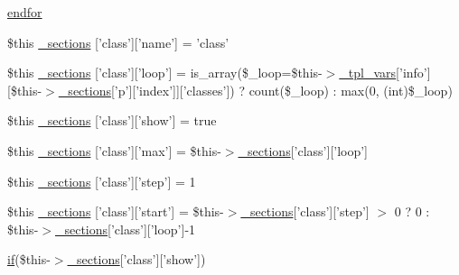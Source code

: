 \begin{DoxyCompactItemize}
\item 
\hyperlink{_06_06-72_05_06_06-727729411_05left__frame_8tpl_8php_ae8fdc27183f296411bac00ed522ee1ac}{endfor}
\item 
\$this \hyperlink{_06_06-72_05_06_06-727729411_05left__frame_8tpl_8php_a1ea4d6d540506331e10a8fa9659c92b7}{\-\_\-sections} \mbox{[}'class'\mbox{]}\mbox{[}'name'\mbox{]} = 'class'
\item 
\$this \hyperlink{_06_06-72_05_06_06-727729411_05left__frame_8tpl_8php_a829b0cac641a3e0ffbc7f229141152a3}{\-\_\-sections} \mbox{[}'class'\mbox{]}\mbox{[}'loop'\mbox{]} = is\-\_\-array(\$\-\_\-loop=\$this-\/$>$\hyperlink{_06_06127_05_06_0612781687_05pkgelementindex_8tpl_8php_a4a4846d8e68d455590131a05697f67a3}{\-\_\-tpl\-\_\-vars}\mbox{[}'info'\mbox{]}\mbox{[}\$this-\/$>$\hyperlink{_06_06127_05_06_0612781687_05pkgelementindex_8tpl_8php_a9e3d26b39edfe29c3f29b8035ef33828}{\-\_\-sections}\mbox{[}'p'\mbox{]}\mbox{[}'index'\mbox{]}\mbox{]}\mbox{[}'classes'\mbox{]}) ? count(\$\-\_\-loop) \-: max(0, (int)\$\-\_\-loop)
\item 
\$this \hyperlink{_06_06-72_05_06_06-727729411_05left__frame_8tpl_8php_a209c3f94d80a4ec45b138b6500500ac9}{\-\_\-sections} \mbox{[}'class'\mbox{]}\mbox{[}'show'\mbox{]} = true
\item 
\$this \hyperlink{_06_06-72_05_06_06-727729411_05left__frame_8tpl_8php_a692ef1edc841eb61cf4530d2c13ff87e}{\-\_\-sections} \mbox{[}'class'\mbox{]}\mbox{[}'max'\mbox{]} = \$this-\/$>$\hyperlink{_06_06127_05_06_0612781687_05pkgelementindex_8tpl_8php_a9e3d26b39edfe29c3f29b8035ef33828}{\-\_\-sections}\mbox{[}'class'\mbox{]}\mbox{[}'loop'\mbox{]}
\item 
\$this \hyperlink{_06_06-72_05_06_06-727729411_05left__frame_8tpl_8php_a5e1b5cd636d07f2560a0aa5d825e998e}{\-\_\-sections} \mbox{[}'class'\mbox{]}\mbox{[}'step'\mbox{]} = 1
\item 
\$this \hyperlink{_06_06-72_05_06_06-727729411_05left__frame_8tpl_8php_aa15083ce89c621e60531057b2ed8cae9}{\-\_\-sections} \mbox{[}'class'\mbox{]}\mbox{[}'start'\mbox{]} = \$this-\/$>$\hyperlink{_06_06127_05_06_0612781687_05pkgelementindex_8tpl_8php_a9e3d26b39edfe29c3f29b8035ef33828}{\-\_\-sections}\mbox{[}'class'\mbox{]}\mbox{[}'step'\mbox{]} $>$ 0 ? 0 \-: \$this-\/$>$\hyperlink{_06_06127_05_06_0612781687_05pkgelementindex_8tpl_8php_a9e3d26b39edfe29c3f29b8035ef33828}{\-\_\-sections}\mbox{[}'class'\mbox{]}\mbox{[}'loop'\mbox{]}-\/1
\item 
\hyperlink{_setup_8inc_8php_ad0184337b31d13763ec8751feff4aabe}{if}(\$this-\/$>$\hyperlink{_06_06127_05_06_0612781687_05pkgelementindex_8tpl_8php_a9e3d26b39edfe29c3f29b8035ef33828}{\-\_\-sections}\mbox{[}'class'\mbox{]}\mbox{[}'show'\mbox{]}) \*

\end{DoxyCompactItemize}
